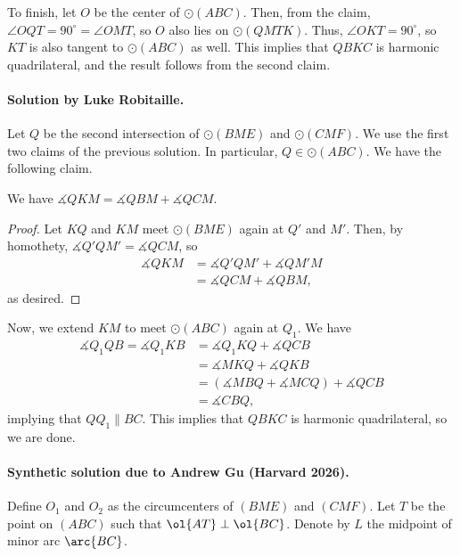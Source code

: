To finish, let $O$ be the center of $\odot(ABC)$. Then, from the claim, $\angle OQT = 90^\circ = \angle OMT$, so $O$ also lies on $\odot(QMTK)$.
Thus, $\angle OKT=90^\circ$, so $KT$ is also tangent to $\odot(ABC)$ as well. This implies that $QBKC$ is harmonic quadrilateral, and the result follows from the second claim.

\paragraph{Solution by Luke Robitaille.}
Let $Q$ be the second intersection of $\odot(BME)$ and
$\odot(CMF)$. We use the first two claims of the previous solution.
In particular, $Q\in\odot(ABC)$. We have the following claim.
\begin{claim*}
We have $\measuredangle QKM = \measuredangle QBM + \measuredangle QCM$.
\end{claim*}
\begin{proof}
    Let $KQ$ and $KM$ meet $\odot(BME)$ again at $Q'$ and $M'$. Then, by homothety, $\measuredangle Q'QM' = \measuredangle QCM$, so
    \begin{align*}
        \measuredangle QKM
	&= \measuredangle Q'QM' + \measuredangle QM'M \\
	&= \measuredangle QCM + \measuredangle QBM,
    \end{align*}
    as desired.
\end{proof}
Now, we extend $KM$ to meet $\odot(ABC)$ again at $Q_1$. We have
\begin{align*}
    \measuredangle Q_1QB
    = \measuredangle Q_1KB
    &= \measuredangle Q_1KQ + \measuredangle QCB \\
    &= \measuredangle MKQ + \measuredangle QKB \\
    &= (\measuredangle MBQ + \measuredangle MCQ)
	+ \measuredangle QCB \\
    &= \measuredangle CBQ,
\end{align*}
implying that $QQ_1\parallel BC$. This implies that $QBKC$ is harmonic quadrilateral, so we are done.

\paragraph{Synthetic solution due to Andrew Gu (Harvard 2026).}
Define $O_1$ and $O_2$ as the circumcenters of $(BME)$ and $(CMF)$.
Let $T$ be the point on $(ABC)$ such that $\ol{AT} \perp \ol{BC}$.
Denote by $L$ the midpoint of minor arc $\arc{BC}$.

